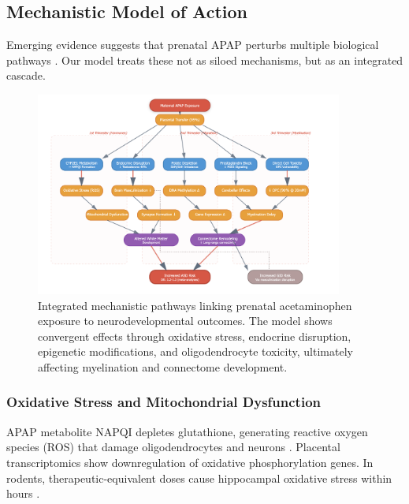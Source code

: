 \documentclass[12pt]{article}
\begin{document}
\subsection{Mechanistic Model of Action}
Emerging evidence suggests that prenatal APAP perturbs multiple biological pathways \citep{baker2020,kristensen2016,zhu2021}. Our model treats these not as siloed mechanisms, but as an integrated cascade.


\begin{figure}[h]
\centering
\includegraphics[width=0.9\textwidth]{../assets/MechanisticPathways.png}
\caption{Integrated mechanistic pathways linking prenatal acetaminophen exposure to neurodevelopmental outcomes. The model shows convergent effects through oxidative stress, endocrine disruption, epigenetic modifications, and oligodendrocyte toxicity, ultimately affecting myelination and connectome development.}
\label{fig:mechanistic-pathways}
\end{figure}


\subsubsection{Oxidative Stress and Mitochondrial Dysfunction}
APAP metabolite NAPQI depletes glutathione, generating reactive oxygen species (ROS) that damage oligodendrocytes and neurons \citep{parker2020,posadas2019}. Placental transcriptomics show downregulation of oxidative phosphorylation genes. In rodents, therapeutic-equivalent doses cause hippocampal oxidative stress within hours \citep{philippot2022,riffel2020}.
\end{document}
